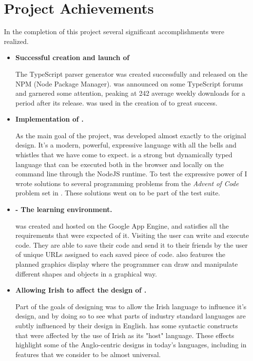 \section{Project Achievements}
In the completion of this project several significant accomplishments were realized.
\begin{itemize}
    \item \textbf{Successful creation and launch of \tsPEG{}}

        The TypeScript parser generator \tsPEG{} was created successfully and released on the NPM (Node Package Manager). \tsPEG{} was announced on some TypeScript forums and garnered some attention, peaking at 242 average weekly downloads for a period after its release. \tsPEG{} was used in the creation of \Setanta{} to great success.

    \item \textbf{Implementation of \Setanta{}.}

        As the main goal of the project, \Setanta{} was developed almost exactly to the original design. It's a modern, powerful, expressive language with all the bells and whistles that we have come to expect. \Setanta{} is a strong but dynamically typed language that can be executed both in the browser and locally on the command line through the NodeJS runtime. To test the expressive power of \Setanta{} I wrote solutions to several programming problems from the \emph{Advent of Code} problem set in \Setanta{}. These solutions went on to be part of the test suite.

    \item \textbf{\trys{} - The \Setanta{} learning environment.}

        \trys{} was created and hosted on the Google App Engine, and satisfies all the requirements that were expected of it. Visiting \trys{} the user can write and execute \Setanta{} code. They are able to save their code and send it to their friends by the user of unique URLs assigned to each saved piece of code. \trys{} also features the planned graphics display where the programmer can draw and manipulate different shapes and objects in a graphical way.

    \item \textbf{Allowing Irish to affect the design of \Setanta{}.}

        Part of the goals of designing \Setanta{} was to allow the Irish language to influence it's design, and by doing so to see what parts of industry standard languages are subtly influenced by their design in English. \Setanta{} has some syntactic constructs that were affected by the use of Irish as its "host" language. These effects highlight some of the Anglo-centric designs in today's languages, including in features that we consider to be almost universal.


\end{itemize}
